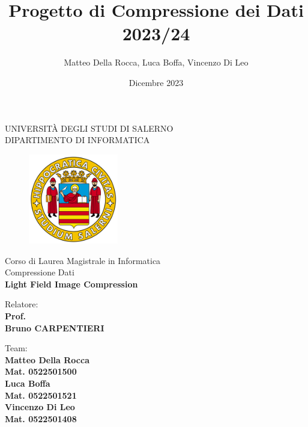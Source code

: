 \documentclass[a4paper, 12pt, oneside]{book}
\title{Progetto di Compressione dei Dati 2023/24}
\author{Matteo Della Rocca, Luca Boffa, Vincenzo Di Leo}
\date{Dicembre 2023}
\begin{document}
\begin{titlepage}
    \begin{center}
        \LARGE{\uppercase{Università degli Studi di Salerno}}\\
        \vspace{5mm}
    	\uppercase{\normalsize Dipartimento di Informatica}\\
    \end{center}
    \begin{figure}[H]
        \centering
        \includegraphics[width=0.35\textwidth]{logo_unisa}
    \end{figure}
    
    \begin{center}
    	\normalsize{ Corso di Laurea Magistrale in Informatica \\ Compressione Dati}\\
            
    	\vspace{15mm}
        {\LARGE{\bf Light Field Image Compression}}\\
    	\vspace{3mm}
    \end{center}
    
    \vspace{15mm}
    \noindent
    \begin{minipage}[t]{0.47\textwidth}
    	{\large{ Relatore:\\\bf Prof. \\Bruno CARPENTIERI}}
    	\vspace{12mm}\\
    \end{minipage}
    \hfill
    \begin{minipage}[t]{0.4\textwidth}\raggedleft
    	{\large{Team: \\ \bf Matteo Della Rocca\\ Mat. 0522501500}}
     {\large{\\ \bf Luca Boffa\\ Mat. 0522501521}}
     {\large{\\ \bf Vincenzo Di Leo\\ Mat. 0522501408}}
            
    \end{minipage}
    
    \vspace{20mm}
    

\end{titlepage}
\end{document}
